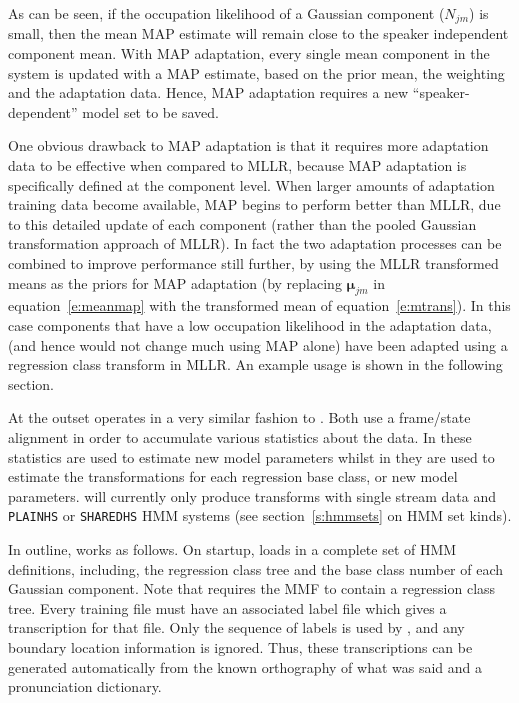 As can be seen, if the occupation likelihood
of a Gaussian component ($N_{jm}$) is small, then the
mean MAP estimate will remain close to the speaker
independent component mean. 
With MAP adaptation, every single mean
component in the system is updated with a MAP estimate, based on the
prior mean, the weighting and the adaptation data. Hence, MAP
adaptation requires a new ``speaker-dependent'' model set to be saved.

One obvious drawback to MAP adaptation is that it requires more
adaptation data to be effective when compared to MLLR, because MAP
adaptation is specifically defined at the component level. When
larger amounts of adaptation training data become available, MAP
begins to perform better than MLLR, due to this detailed update of
each component (rather than the pooled Gaussian transformation
approach of MLLR). In fact the two adaptation processes can be
combined to improve performance still further, by using the MLLR
transformed means as the priors for MAP adaptation (by replacing
$\bm{\mu}_{jm}$ in equation~\ref{e:meanmap} with the transformed mean
of equation~\ref{e:mtrans}). In this case
components that have a low occupation likelihood in the adaptation
data, (and hence would not change much using MAP alone) have been
adapted using a regression class transform in MLLR. An example usage
is shown in the following section. 

\pagebreak
{}

At the outset  operates in a very similar fashion to
. Both use a frame/state alignment
in order to accumulate various statistics about the data. In
 these statistics are used to estimate new model
parameters whilst in  they are used to estimate 
the transformations for each regression base class, or new model
parameters.  will
currently only produce transforms with single stream data and
\texttt{PLAINHS} or \texttt{SHAREDHS} HMM systems (see
section~\ref{s:hmmsets} on HMM set kinds).

In outline,  works as follows. On startup,  
loads in a complete set of HMM definitions, including, the
regression class tree and the base class number of each Gaussian
component. Note that  requires the MMF to contain a
regression class tree. Every training file must
have an associated label file which gives a transcription for that
file.  Only the sequence of labels is used by ,
and any boundary location information is ignored.  Thus, these
transcriptions can be generated automatically from the known
orthography of what was said and a pronunciation dictionary.

